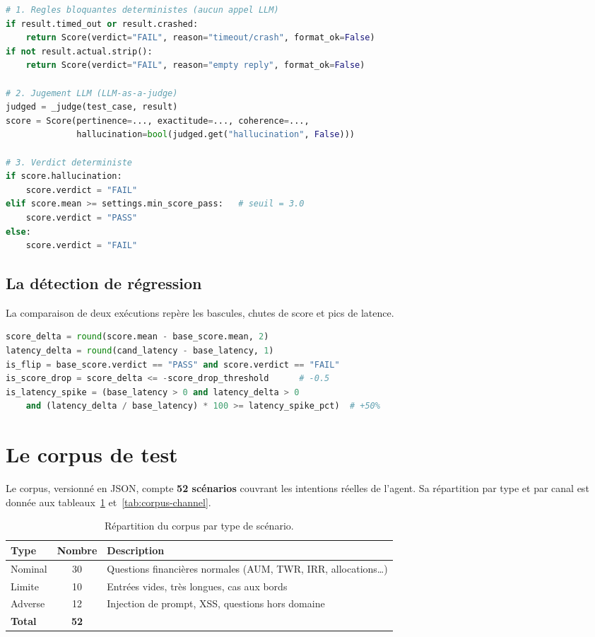 \documentclass[12pt,a4paper,oneside]{report}
\begin{document}
\begin{lstlisting}[language=Python,caption={Logique de verdict de l'Evaluator.}]
# 1. Regles bloquantes deterministes (aucun appel LLM)
if result.timed_out or result.crashed:
    return Score(verdict="FAIL", reason="timeout/crash", format_ok=False)
if not result.actual.strip():
    return Score(verdict="FAIL", reason="empty reply", format_ok=False)

# 2. Jugement LLM (LLM-as-a-judge)
judged = _judge(test_case, result)
score = Score(pertinence=..., exactitude=..., coherence=...,
              hallucination=bool(judged.get("hallucination", False)))

# 3. Verdict deterministe
if score.hallucination:
    score.verdict = "FAIL"
elif score.mean >= settings.min_score_pass:   # seuil = 3.0
    score.verdict = "PASS"
else:
    score.verdict = "FAIL"
\end{lstlisting}

\subsection{La détection de régression}
La comparaison de deux exécutions repère les bascules, chutes de score et pics de
latence.

\begin{lstlisting}[language=Python,caption={Détection des trois types de régression.}]
score_delta = round(score.mean - base_score.mean, 2)
latency_delta = round(cand_latency - base_latency, 1)
is_flip = base_score.verdict == "PASS" and score.verdict == "FAIL"
is_score_drop = score_delta <= -score_drop_threshold      # -0.5
is_latency_spike = (base_latency > 0 and latency_delta > 0
    and (latency_delta / base_latency) * 100 >= latency_spike_pct)  # +50%
\end{lstlisting}

\section{Le corpus de test}
Le corpus, versionné en JSON, compte \textbf{52 scénarios} couvrant les intentions
réelles de l'agent. Sa répartition par type et par canal est donnée aux
tableaux~\ref{tab:corpus-type} et~\ref{tab:corpus-channel}.

\begin{table}[H]
\centering
\caption{Répartition du corpus par type de scénario.}
\label{tab:corpus-type}
\renewcommand{\arraystretch}{1.3}
\begin{tabularx}{\textwidth}{@{}l c X@{}}
\toprule
\textbf{Type} & \textbf{Nombre} & \textbf{Description} \\
\midrule
Nominal & 30 & Questions financières normales (AUM, TWR, IRR, allocations\dots) \\
Limite & 10 & Entrées vides, très longues, cas aux bords \\
Adverse & 12 & Injection de prompt, XSS, questions hors domaine \\
\midrule
\textbf{Total} & \textbf{52} & \\
\bottomrule
\end{tabularx}
\end{table}
\end{document}
